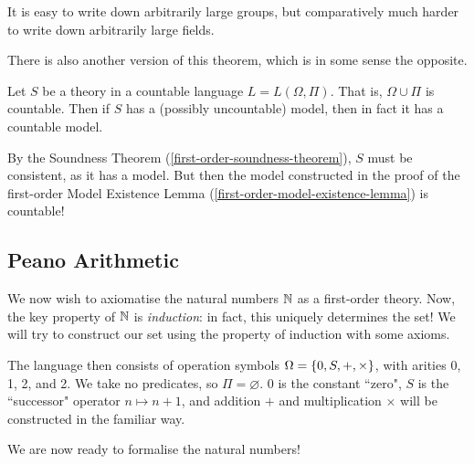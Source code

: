 \documentclass{article}
\begin{document}
\begin{note}
	It is easy to write down arbitrarily large groups, but comparatively much harder to write down arbitrarily large fields.
\end{note}

There is also another version of this theorem, which is in some sense the opposite.

\begin{theorem}
	\label{downward-lowenheim-skolem}
    Let $S$ be a theory in a countable language $L = L(\Omega, \Pi)$. That is, $\Omega \cup \Pi$ is countable. Then if $S$ has a (possibly uncountable) model, then in fact it has a countable model.
\end{theorem}

\begin{prf}
    By the Soundness Theorem (\ref{first-order-soundness-theorem}), $S$ must be consistent, as it has a model. But then the model constructed in the proof of the first-order Model Existence Lemma (\ref{first-order-model-existence-lemma}) is countable!
\end{prf}


\subsection{Peano Arithmetic}
\label{section-first-order-peano-arithmetic}

We now wish to axiomatise the natural numbers $\mathbb{N}$ as a first-order theory. Now, the key property of $\mathbb{N}$ is \textit{induction}: in fact, this uniquely determines the set! We will try to construct our set using the property of induction with some axioms.

The language then consists of operation symbols $\Omega = \left\lbrace 0, S, +, \times \right\rbrace$, with arities 0, 1, 2, and 2. We take no predicates, so $\Pi = \varnothing$. 0 is the constant ``zero", $S$ is the ``successor" operator $n \mapsto n + 1$, and addition $+$ and multiplication $\times$ will be constructed in the familiar way.

We are now ready to formalise the natural numbers!
\end{document}
